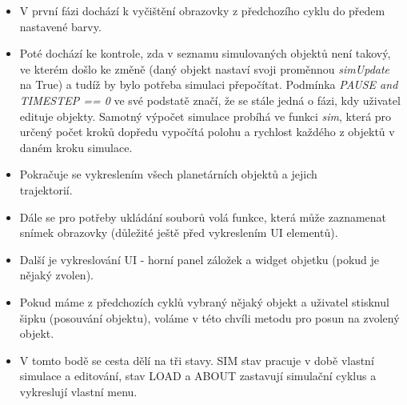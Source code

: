 \documentclass[a4paper, 12pt]{article}
\begin{document}
\begin{itemize}
    \setlength\itemsep{-3pt}
    \item V první fázi dochází k vyčištění obrazovky z předchozího cyklu do
        předem nastavené barvy. 

    \item Poté dochází ke kontrole, zda v seznamu simulovaných objektů není
        takový, ve kterém došlo ke změně (daný objekt nastaví svoji proměnnou
        \emph{simUpdate} na True) a tudíž by bylo potřeba simulaci přepočítat.
        Podmínka \emph{PAUSE and TIMESTEP == 0} ve své podstatě značí, že se
        stále jedná o fázi, kdy uživatel edituje objekty. Samotný výpočet
        simulace probíhá ve funkci \emph{sim}, která pro určený počet kroků
        dopředu vypočítá polohu a rychlost každého z objektů v daném kroku
        simulace.

    \item Pokračuje se vykreslením všech planetárních objektů a jejich \\trajektorií.

    \item Dále se pro potřeby ukládání souborů volá funkce, která může
        zaznamenat snímek obrazovky (důležité ještě před vykreslením UI
        elementů).
    
    \item Další je vykreslování UI - horní panel záložek a widget objetku
        (pokud je nějaký zvolen).

    \item Pokud máme z předchozích cyklů vybraný nějaký objekt a uživatel
        stisknul šipku (posouvání objektu), voláme v této chvíli metodu pro
        posun na zvolený objekt.

    \item V tomto bodě se cesta dělí na tři stavy. SIM stav pracuje v době
        vlastní simulace a editování, stav LOAD a ABOUT zastavují simulační
        cyklus a vykreslují vlastní menu.
        

\end{itemize}
\end{document}
